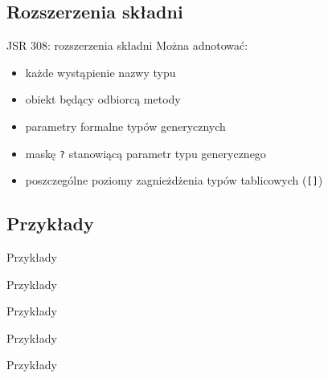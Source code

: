 \documentclass{beamer}
\begin{document}
\subsection{Rozszerzenia składni}

\begin{frame}{JSR 308: rozszerzenia składni}
  Można adnotować:
  \begin{itemize}
  \item<1-> każde wystąpienie nazwy typu
  \item<2-> obiekt będący odbiorcą metody
  \item<3-> parametry formalne typów generycznych
  \item<4-> maskę \texttt{?} stanowiącą parametr typu generycznego
  \item<5-> poszczególne poziomy zagnieżdżenia typów tablicowych (\texttt{[]})
  \end{itemize}
\end{frame}

\subsection{Przykłady}

\begin{frame}{Przykłady}
  
  
\end{frame}

\begin{frame}{Przykłady}
  
  
\end{frame}

\begin{frame}{Przykłady}
  
  
\end{frame}

\begin{frame}{Przykłady}
  
  
\end{frame}

\begin{frame}{Przykłady}
  
\end{frame}
\end{document}
